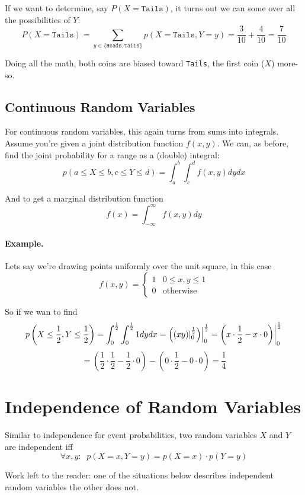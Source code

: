 If we want to determine, say $P(X=\texttt{Tails})$, it turns out we can some over all the possibilities of $Y$: 
\[P(X=\texttt{Tails}) = \sum_{y\in\{\texttt{Heads},\texttt{Tails}\}}p(X=\texttt{Tails},Y=y) = \frac{3}{10} + \frac{4}{10} = \frac{7}{10}\]

Doing all the math, both coins are biased toward \texttt{Tails},  the first coin ($X$) more-so. 

\subsection{Continuous Random Variables}
For continuous random variables, this again turns from sums into integrals. 
Assume you're given a joint distribution function $f(x,y)$.
We can, as before, find the joint probability for a range as a (double) integral: 
\[p(a \le X \le b, c \le Y \le d) = \int_a^b \int_c^d f(x,y) dy dx\]

And to get a marginal distribution function 
\[f(x) = \int_{-\infty}^\infty f(x,y) dy\]


\paragraph{Example.} 
Lets say we're drawing points uniformly over the unit square, 
in this case 
\[f(x,y) = \begin{cases} 1 & 0 \le x,y \le 1\\ 0 & \text{otherwise}\end{cases}\]

So if we wan to find 
\[ p\left(X\le \frac{1}{2}, Y \le \frac{1}{2}\right) = \int_0^\frac{1}{2} \int_0^\frac{1}{2} 1 dydx = 
\left(\left(xy\middle)\right\rvert_{0}^{\frac{1}{2}}\middle)\right\rvert_{0}^{\frac{1}{2}} = 
\left(x\cdot\frac{1}{2}-x\cdot0\middle)\right\rvert_{0}^{\frac{1}{2}}\]\[ = 
\left(\frac{1}{2}\cdot\frac{1}{2} - \frac{1}{2}\cdot0\right) - \left(0 \cdot\frac{1}{2} - 0 \cdot 0\right) = \frac{1}{4}\]

\section{Independence of Random Variables}
Similar to independence for event probabilities, two random variables $X$ and $Y$ are independent iff 
\[
\forall x, y : \;\; p(X=x,Y=y) = p(X=x)\cdot p(Y=y)
\]


Work left to the reader: one of the situations below  describes independent random variables the other does not. 

